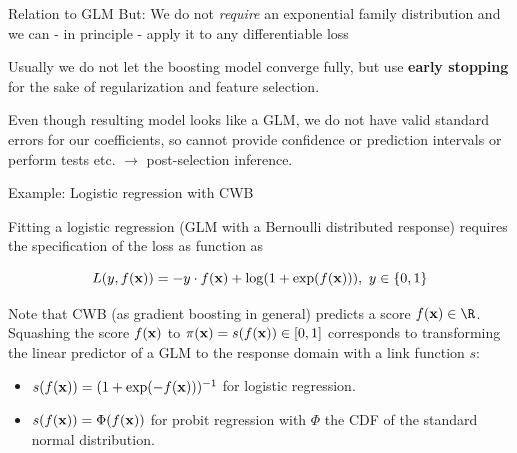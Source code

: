 \documentclass[11pt,compress,t,notes=noshow, xcolor=table]{beamer}
\begin{document}
\begin{vbframe}{Relation to GLM}
But: We do not \emph{require} an exponential family distribution and we can - in principle - apply it to any differentiable loss %

\lz

Usually we do not let the boosting model converge fully, but use \textbf{early stopping} for the sake of regularization and feature selection.

\lz

Even though resulting model looks like a GLM, we do not have valid standard
errors for our coefficients,
so cannot provide confidence or prediction intervals or perform tests etc.
$\rightarrow$ post-selection inference.

\end{vbframe}


\begin{vbframe}{Example: Logistic regression with CWB}

Fitting a logistic regression (GLM with a Bernoulli distributed response) requires the specification of the loss as function as

$$
  L(y, f(\mathbf{x})) = -y \cdot f(\mathbf{x}) + \log (1 + \exp(f(\mathbf{x}))),\ y\in\{0, 1\}
$$

Note that CWB (as gradient boosting in general) predicts a score $\fx \in \R$. Squashing the score $f(\mathbf{x})$ to $\pi(\mathbf{x}) = s(f(\mathbf{x})) \in [0,1]$ corresponds to transforming the linear predictor of a GLM to the response domain with a link function $s$:

\begin{itemize}
  \item $s(f(\mathbf{x})) = (1 + \exp(-f(\mathbf{x})))^{-1}$ for logistic regression.
  \item $s(f(\mathbf{x})) = \Phi(f(\mathbf{x}))$ for probit regression with $\Phi$ the CDF of the standard normal distribution.
\end{itemize}

\end{vbframe}


\end{document}
